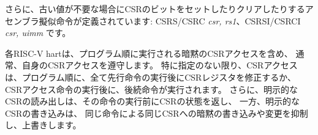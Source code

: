 \begin{comment}
Further assembler pseudoinstructions are defined to set and clear
bits in the CSR when the old value is not required: CSRS/CSRC {\em
  csr, rs1}; CSRSI/CSRCI {\em csr, uimm}.
\end{comment}

さらに、古い値が不要な場合にCSRのビットをセットしたりクリアしたりするアセンブラ擬似命令が定義されています:
CSRS/CSRC {\em csr, rs1}、CSRSI/CSRCI {\em csr, uimm} です。


\begin{comment}
\subsection*{CSR Access Ordering}
\end{comment}

\begin{comment}
Each RISC-V hart normally observes its own CSR accesses, including its
implicit CSR accesses, as performed in program order.
In particular, unless specified otherwise, a CSR access is performed
after the execution of any prior instructions in program order whose behavior
modifies or is modified by the CSR state and before the execution of any
subsequent instructions in program order whose behavior modifies or is modified
by the CSR state.
Furthermore, an explicit CSR read returns the
CSR state before the execution of the instruction, while an
explict CSR write suppresses and overrides any implicit writes or
modifications to the same CSR by the same instruction.
\end{comment}

各RISC-V hartは、プログラム順に実行される暗黙のCSRアクセスを含め、
通常、自身のCSRアクセスを遵守します。
特に指定のない限り、CSRアクセスは、プログラム順に、全て先行命令の実行後にCSRレジスタを修正するか、
CSRアクセス命令の実行後に、後続命令が実行されます。
さらに、明示的なCSRの読み出しは、その命令の実行前にCSRの状態を返し、
一方、明示的なCSRの書き込みは、
同じ命令による同じCSRへの暗黙の書き込みや変更を抑制し、上書きします。

\begin{comment}
Likewise, any side effects from an explicit CSR access are normally
observed to occur synchronously in program order.
Unless specified otherwise, the full consequences of any such side
effects are observable by the very next instruction, and no consequences
may be observed out-of-order by preceding instructions.
(Note the distinction made earlier between side effects and indirect
effects of CSR writes.)
\end{comment}

